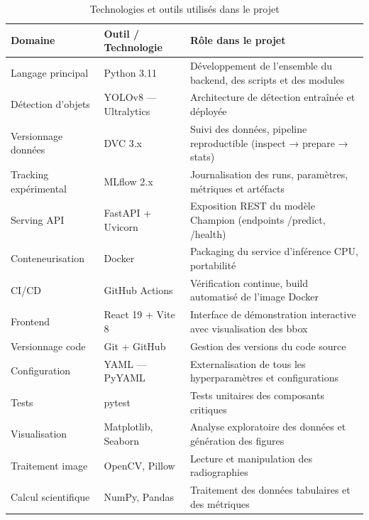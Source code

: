 \documentclass{rapportENSIAS}
\begin{document}
\begin{table}[H]
\centering
\caption{Technologies et outils utilisés dans le projet}
\label{tab:technologies}
\begin{tabular}{p{3.2cm} p{3.8cm} p{7cm}}
\toprule
\textbf{Domaine} & \textbf{Outil / Technologie} & \textbf{Rôle dans le projet} \\
\midrule
Langage principal     & Python 3.11              & Développement de l'ensemble du backend, des scripts et des modules \\
\midrule
Détection d'objets    & YOLOv8 — Ultralytics     & Architecture de détection entraînée et déployée \\
\midrule
Versionnage données   & DVC 3.x                  & Suivi des données, pipeline reproductible (inspect → prepare → stats) \\
\midrule
Tracking expérimental & MLflow 2.x               & Journalisation des runs, paramètres, métriques et artéfacts \\
\midrule
Serving API           & FastAPI + Uvicorn        & Exposition REST du modèle Champion (endpoints /predict, /health) \\
\midrule
Conteneurisation      & Docker                   & Packaging du service d'inférence CPU, portabilité \\
\midrule
CI/CD                 & GitHub Actions           & Vérification continue, build automatisé de l'image Docker \\
\midrule
Frontend              & React 19 + Vite 8        & Interface de démonstration interactive avec visualisation des bbox \\
\midrule
Versionnage code      & Git + GitHub             & Gestion des versions du code source \\
\midrule
Configuration         & YAML — PyYAML            & Externalisation de tous les hyperparamètres et configurations \\
\midrule
Tests                 & pytest                   & Tests unitaires des composants critiques \\
\midrule
Visualisation         & Matplotlib, Seaborn      & Analyse exploratoire des données et génération des figures \\
\midrule
Traitement image      & OpenCV, Pillow           & Lecture et manipulation des radiographies \\
\midrule
Calcul scientifique   & NumPy, Pandas            & Traitement des données tabulaires et des métriques \\
\bottomrule
\end{tabular}
\end{table}
\end{document}
